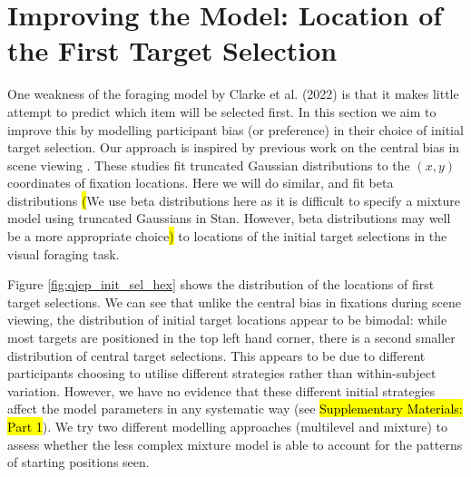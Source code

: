 \documentclass[vision,article,accept,pdftex,moreauthors]{Definitions/mdpi}
\begin{document}
\section{Improving the Model: Location of the First Target Selection \label{s4}}

One weakness of the foraging model by Clarke et al. (2022) \cite{clarke2022foraging} is that it makes little attempt to predict which item will be selected first. In this section we aim to improve this by modelling participant bias (or preference) in their choice of initial target selection. Our approach is inspired by previous work on the central bias in scene viewing \cite{clarke2014deriving, clarke2017}. These studies fit truncated Gaussian distributions to the  $(x,y)$ coordinates of fixation locations. Here we will do similar, and fit beta distributions \hl{(}We use beta distributions here as it is difficult to specify a mixture model using truncated Gaussians in Stan. However, beta distributions may well be a more appropriate choice\hl{)} %
to locations of the initial target selections in the visual foraging task. 

Figure \ref{fig:qjep_init_sel_hex} shows the distribution of the locations of first target selections. We can see that unlike the central bias in fixations during scene viewing, the distribution of initial target locations appear to be bimodal: while most targets are positioned in the top left hand corner, there is a second smaller distribution of central target selections. This appears to be due to different participants choosing to utilise different strategies rather than within-subject variation. However, we have no evidence that these different initial strategies affect the model parameters in any systematic way (see {\hl{Supplementary Materials: Part 1}}). We try two different modelling approaches (multilevel and mixture) to assess whether the less complex mixture model is able to account for the patterns of starting positions seen.
\end{document}
